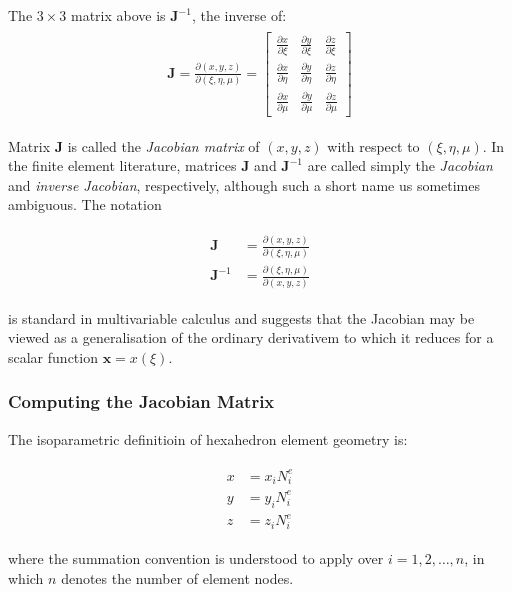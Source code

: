 \documentclass[10pt,b5paper,titlepage]{book}
\newcommand{\m}{\mathbf}
\newenvironment{eqarray}
{
    \begin{eqnarray}
        \begin{aligned}
}
{
        \end{aligned}
    \end{eqnarray}
}
\begin{document}
The $ 3 \times 3 $ matrix above is $ \m{J}^{-1} $, the inverse of:
\begin{eqarray}
    \m{J} = \frac{\partial \left( x, y, z \right)}{\partial \left( \xi, \eta, \mu \right)}
    = \begin{bmatrix}
        \frac{\partial x}{\partial \xi} &
        \frac{\partial y}{\partial \xi} &
        \frac{\partial z}{\partial \xi} \\
        \frac{\partial x}{\partial \eta} &
        \frac{\partial y}{\partial \eta} &
        \frac{\partial z}{\partial \eta} \\
        \frac{\partial x}{\partial \mu} &
        \frac{\partial y}{\partial \mu} &
        \frac{\partial z}{\partial \mu}
    \end{bmatrix}
\end{eqarray}

Matrix $ \m{J} $ is called the \textit{Jacobian matrix} of $ (x, y, z) $
with respect to $ (\xi, \eta, \mu) $. In the finite element literature, matrices
$ \m{J} $ and $ \m{J}^{-1} $ are called simply the \textit{Jacobian} and
\textit{inverse Jacobian}, respectively, although such a short name us sometimes
ambiguous. The notation

\begin{eqarray}
    \m{J} &=
    \frac{\partial \left(x, y, z \right)}{\partial \left(\xi, \eta, \mu \right)}\\
    \m{J}^{-1} &=
    \frac{\partial \left(\xi, \eta, \mu \right)}{\partial \left(x, y, z \right)}
\end{eqarray}

is standard in multivariable calculus and suggests that the Jacobian may be viewed as
a generalisation of the ordinary derivativem to which it reduces for a scalar
function $ \m{x} = x(\xi) $.



\subsubsection{Computing the Jacobian Matrix}
The isoparametric definitioin of hexahedron element geometry is:

\begin{eqarray}
    x &= x_i N_i^e\\
    y &= y_i N_i^e\\
    z &= z_i N_i^e
\end{eqarray}

where the summation convention is understood to apply over $ i = 1, 2, \dots , n $,
in which $ n $ denotes the number of element nodes.
\end{document}
